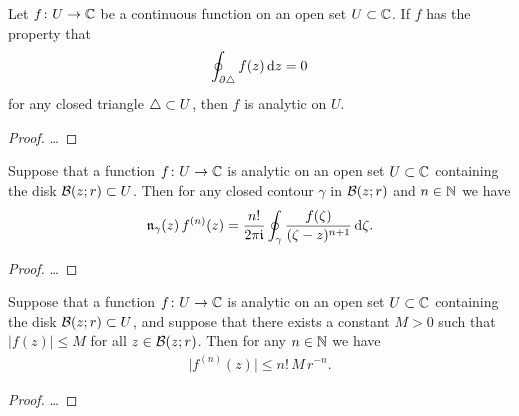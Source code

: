 \begin{theorem}
  \label{thm:morera}
  Let $f \colon U \to \bC$ be a continuous function on an open set $U \subset \bC$.
  If $f$ has the property that
  \begin{align*}
    \oint_{\bdry \Tri} f(z) \, \ud z = 0
  \end{align*}
  for any closed triangle $\Tri \subset U$, then $f$ is analytic on $U$.
\end{theorem}
\begin{proof}
  \ldots
\end{proof}

\begin{theorem}
  \label{thm:cauchy_formula_derivative}
  Suppose that a function $f \colon U \to \bC$ is analytic on an open
  set $U \subset \bC$ containing the disk $\DiskRC{r}{z} \subset U$.
  Then for any closed contour $\gamma$ in $\DiskRC{r}{z}$
  and $n \in \bN$ we have
  \begin{align*}
    \windN{\gamma}{z} \, f^{(n)}(z)
      = \frac{n!}{2\pi \ii} \oint_\gamma \frac{f(\zeta)}{(\zeta - z)^{n+1}} \, \ud \zeta .
  \end{align*}
\end{theorem}
\begin{proof}
  \ldots
\end{proof}

\begin{lemma}
  \label{lem:cauchy_derivative_estimate}
  Suppose that a function $f \colon U \to \bC$ is analytic on an open
  set $U \subset \bC$ containing the disk $\DiskRC{r}{z} \subset U$,
  and suppose that there exists a constant $M>0$ such that
  $|f(z)| \le M$ for all $z \in \DiskRC{r}{z}$.
  Then for any $n \in \bN$ we have
  \begin{align*}
    \big| f^{(n)}(z) \big| \le n! \, M \, r^{-n} .
  \end{align*}
\end{lemma}
\begin{proof}
  \ldots
\end{proof}



